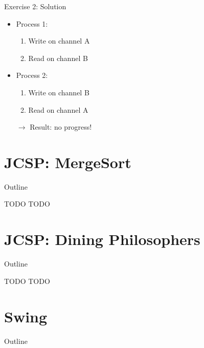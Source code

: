 \begin{frame}{Exercise 2: Solution}
  \begin{itemize}
  \item Process 1:
    \begin{enumerate}
    \item Write on channel A
    \item Read on channel B
    \end{enumerate}
  \item Process 2:
    \begin{enumerate}
    \item Write on channel B
    \item Read on channel A
    \end{enumerate}
  \item[$\rightarrow$] Result: no progress!
  \end{itemize}
\end{frame}


\section{JCSP: MergeSort}

\begin{frame}{Outline}
  \tableofcontents[current]
\end{frame}

\begin{frame}{TODO}
  TODO
\end{frame}


\section{JCSP: Dining Philosophers}

\begin{frame}{Outline}
  \tableofcontents[current]
\end{frame}

\begin{frame}{TODO}
  TODO
\end{frame}


\section{Swing}

\begin{frame}{Outline}
  \tableofcontents[current]
\end{frame}

